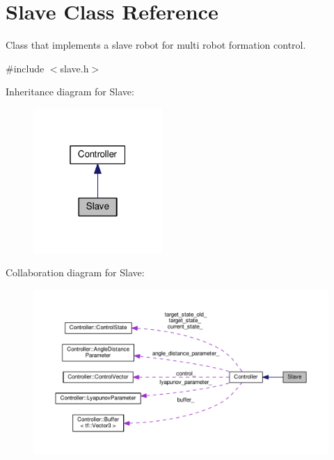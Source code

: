 \hypertarget{classSlave}{}\section{Slave Class Reference}
\label{classSlave}


Class that implements a slave robot for multi robot formation control.  




{\ttfamily \#include $<$slave.\+h$>$}



Inheritance diagram for Slave\+:\nopagebreak
\begin{figure}[H]
\begin{center}
\leavevmode
\includegraphics[width=139pt]{de/ddb/classSlave__inherit__graph}
\end{center}
\end{figure}


Collaboration diagram for Slave\+:\nopagebreak
\begin{figure}[H]
\begin{center}
\leavevmode
\includegraphics[width=350pt]{dc/d76/classSlave__coll__graph}
\end{center}
\end{figure}
